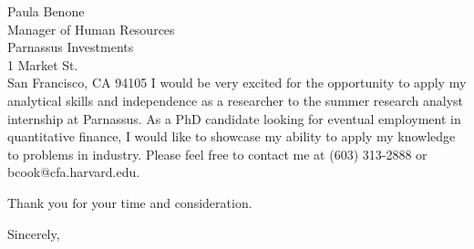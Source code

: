 \documentclass{letter}
\begin{document}
\begin{letter}{Paula Benone\\
    Manager of Human Resources\\ Parnassus Investments\\
    1 Market St.\\
    San Francisco, CA 94105}
\noindent I would be very excited for the opportunity to apply my
analytical skills and independence as a researcher to the summer
research analyst internship at Parnassus. As a PhD candidate
looking for eventual employment in quantitative finance, I would like
to showcase my ability to apply my knowledge to problems in industry.
Please feel free to contact me at (603) 313-2888 or
bcook@cfa.harvard.edu.

Thank you for your time and consideration.


\closing{Sincerely,}


\end{letter}
\end{document}
